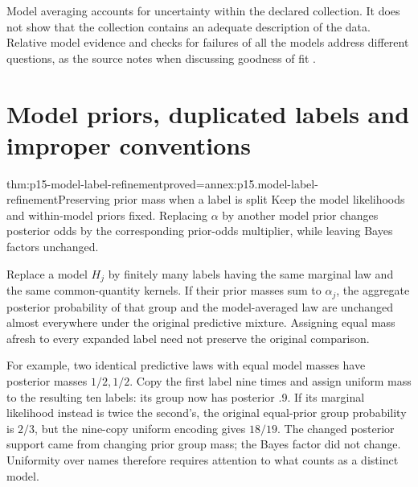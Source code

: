 Model averaging accounts for uncertainty within the declared collection.
It does not show that the collection contains an adequate description of
the data. Relative model evidence and checks for failures of all the models
address different questions, as the source notes when discussing goodness
of fit \cite[Sec.~8.2]{KassRaftery1995BayesFactors}.

\section{Model priors, duplicated labels and improper conventions}
\label{sec:p15-model-prior-conventions}

\begin{hbtheorem}{thm:p15-model-label-refinement}{proved=annex:p15.model-label-refinement}{Preserving prior mass when a label is split}
Keep the model likelihoods and within-model priors fixed. Replacing
\(\alpha\) by another model prior changes posterior odds by the corresponding
prior-odds multiplier, while leaving Bayes factors unchanged.

Replace a model \(H_j\) by finitely many labels having the same marginal
law and the same common-quantity kernels. If their prior masses sum to
\(\alpha_j\), the aggregate posterior probability of that group and the
model-averaged law are unchanged almost everywhere under the original
predictive mixture. Assigning equal mass afresh to every
expanded label need not preserve the original comparison.
\end{hbtheorem}

For example, two identical predictive laws with equal model masses have
posterior masses \(1/2,1/2\). Copy the first label nine times and assign
uniform mass to the resulting ten labels: its group now has posterior .9.
If its marginal likelihood instead is twice the second's, the original
equal-prior group probability is \(2/3\), but the nine-copy uniform encoding
gives \(18/19\). The changed posterior support came from changing prior
group mass; the Bayes factor did not change. Uniformity over names therefore
requires attention to what counts as a distinct model.

